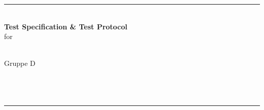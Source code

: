 \begin{titlepage}
    \centering
    
    \rule{0.9\textwidth}{4pt}\\[1.2cm]

    {\Huge\bfseries Test Specification \& Test Protocol}\\[1.6cm]

    {\Large for}\\[1.2cm]

    {\LARGE\bfseries \titel}\\[1.6cm]

    \vfill

    {\large Gruppe D}\\[0.3cm]
    {\Large \autor}\\[1.6cm]

    {\large \institut}\\[1.6cm]

    {\large \datum}\\[1.4cm]

    \rule{0.9\textwidth}{4pt}

\end{titlepage}
